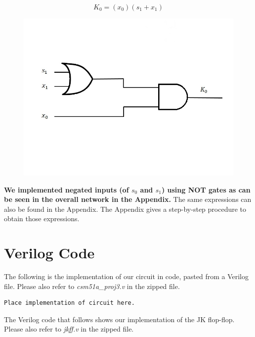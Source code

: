 \documentclass{article}
\begin{document}
\begin{equation*}
K_0 = (x_0)(s_1 + x_1)
\end{equation*}
\begin{figure}[h!]
\centering
\includegraphics[scale=0.3]{K0}
\end{figure}

\textbf{We implemented negated inputs (of $s_0$ and $s_1$) using NOT gates as 
can be seen in the overall network in the Appendix.}
The same expressions can also be found in the Appendix. The Appendix gives a 
step-by-step procedure to obtain those expressions.


\section{Verilog Code}
The following is the implementation of our circuit in code, pasted from a 
Verilog file. Please also refer to \textit{csm51a\_proj3.v} in the zipped 
file.\\

\begin{verbatim}
Place implementation of circuit here.
\end{verbatim}

The Verilog code that follows shows our implementation of the JK flop-flop. 
Please also refer to \textit{jkff.v} in the zipped file.\\
\end{document}
